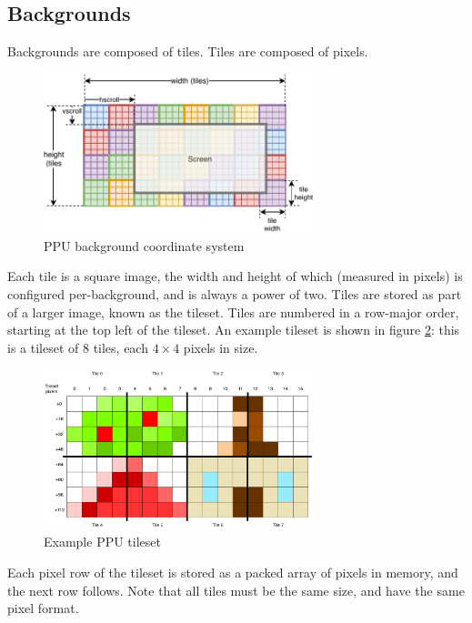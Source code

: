 \subsection{Backgrounds}

Backgrounds are composed of tiles. Tiles are composed of pixels.

\begin{figure}[H]
\centering
\caption{PPU background coordinate system}
\label{diagram:ppu_bg_coords}
\includegraphics[width=0.7\textwidth]{diagrams/ppu_bg_coords.pdf}
\end{figure}

Each tile is a square image, the width and height of which (measured in pixels) is configured per-background, and is always a power of two. Tiles are stored as part of a larger image, known as the tileset. Tiles are numbered in a row-major order, starting at the top left of the tileset. An example tileset is shown in figure \ref{diagram:ppu_tileset}: this is a tileset of 8 tiles, each $4\times 4$ pixels in size.

\begin{figure}[H]
\centering
\caption{Example PPU tileset}
\label{diagram:ppu_tileset}
\includegraphics[width=0.7\textwidth]{diagrams/ppu_tileset.pdf}
\end{figure}

Each pixel row of the tileset is stored as a packed array of pixels in memory, and the next row follows. Note that all tiles must be the same size, and have the same pixel format.

